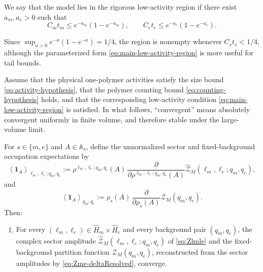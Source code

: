 \begin{definition}
	\label{def:low-activity-region}
	We say that the model lies in the rigorous low-activity region if there exist
	\(a_m,a_e>0\) such that
	\begin{equation}
		C_m t_m \le e^{-a_m}(1-e^{-a_m}),
		\qquad
		C_e t_e \le e^{-a_e}(1-e^{-a_e}).
		\label{eq:main-low-activity-region}
	\end{equation}
\end{definition}

Since \(\sup_{a>0}e^{-a}(1-e^{-a})=1/4\), the region is nonempty whenever
\(C_s t_s<1/4\), although the parameterized form
\eqref{eq:main-low-activity-region} is more useful for tail bounds.



\begin{theorem}
	\label{thm:low-activity-region}
	Assume that the physical one-polymer activities satisfy the size bound
	\eqref{eq:activity-hypothesis}, that the polymer counting bound
	\eqref{eq:counting-hypothesis} holds, and that the corresponding low-activity
	condition \eqref{eq:main-low-activity-region} is satisfied. In what follows,
	``convergent'' means absolutely convergent uniformly in finite volume, and therefore
	stable under the large-volume limit.
	
	For \(s\in\{m,e\}\) and \(A\in\mathbb A_s\), define the unnormalized sector and
	fixed-background occupation expectations by
	\begin{equation}
		\left\langle \mathbf 1_A \right\rangle_{\ell_m,\ell_e;q_m,q_e}
		:=
		\rho^{\ell_m,\ell_e;q_m,q_e}(A)\,
		\frac{\partial}{\partial \rho^{\ell_m,\ell_e;q_m,q_e}(A)}
		\widehat{\mathcal Z}_M(\ell_m,\ell_e;q_m,q_e),
		\label{eq:physical-sector-occupancy}
	\end{equation}
	and
	\begin{equation}
		\left\langle \mathbf 1_A \right\rangle_{q_m,q_e}
		:=
		\rho_s(A)\,
		\frac{\partial}{\partial \rho_s(A)}
		\mathcal Z_M(q_m,q_e).
		\label{eq:physical-fixed-background-occupancy}
	\end{equation}
	Then:
	\begin{enumerate}[label=(\roman*)]
		\item \label{thmItem:Zfinite}
		For every \((\ell_m,\ell_e)\in\widehat H_m\times\widehat H_e\) and every
		background pair \((q_m,q_e)\), the complex sector amplitude
		\(\widehat{\mathcal Z}_M(\ell_m,\ell_e;q_m,q_e)\) of \eqref{eq:Zlmle} and the
		fixed-background partition function \(\mathcal Z_M(q_m,q_e)\), reconstructed from
		the sector amplitudes by \eqref{eq:Zme-deltaResolved}, converge.
		

\end{enumerate}
\end{theorem}
